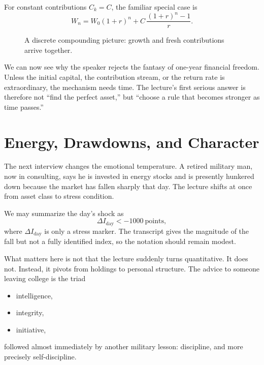 For constant contributions \(C_k=C\), the familiar special case is
\begin{equation}
W_n = W_0(1+r)^n + C\,\frac{(1+r)^n-1}{r}.
\end{equation}

\begin{figure}[htbp]
\centering
{}
\caption{A discrete compounding picture: growth and fresh contributions arrive together.}
\end{figure}

We can now see why the speaker rejects the fantasy of one-year financial freedom. Unless the initial capital, the contribution stream, or the return rate is extraordinary, the mechanism needs time. The lecture's first serious answer is therefore not ``find the perfect asset,'' but ``choose a rule that becomes stronger as time passes.''

\section{Energy, Drawdowns, and Character}

The next interview changes the emotional temperature. A retired military man, now in consulting, says he is invested in energy stocks and is presently hunkered down because the market has fallen sharply that day. The lecture shifts at once from asset class to stress condition.

We may summarize the day's shock as
\begin{equation}
\Delta I_{\text{day}} < -1000\ \text{points},
\end{equation}
where \(\Delta I_{\text{day}}\) is only a stress marker. The transcript gives the magnitude of the fall but not a fully identified index, so the notation should remain modest.

What matters here is not that the lecture suddenly turns quantitative. It does not. Instead, it pivots from holdings to personal structure. The advice to someone leaving college is the triad
\begin{itemize}
\item intelligence,
\item integrity,
\item initiative,
\end{itemize}
followed almost immediately by another military lesson: discipline, and more precisely self-discipline.

